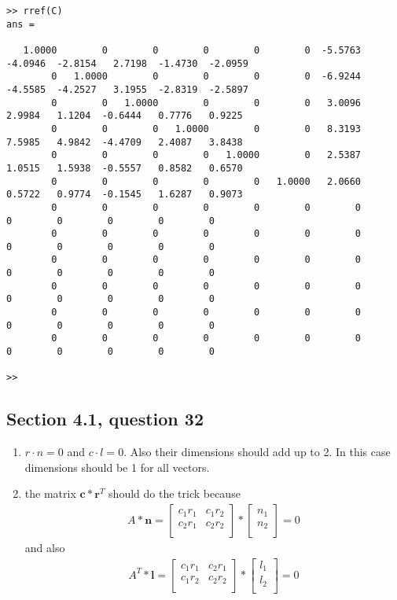 \documentclass[a4paper,11pt]{article}
\newcommand{\mybf}[1]{\boldsymbol{#1}}
\begin{document}
\begin{Verbatim}[fontsize=\tiny]
>> rref(C)
ans =

   1.0000        0        0        0        0        0  -5.5763  -4.0946  -2.8154   2.7198  -1.4730  -2.0959
        0   1.0000        0        0        0        0  -6.9244  -4.5585  -4.2527   3.1955  -2.8319  -2.5897
        0        0   1.0000        0        0        0   3.0096   2.9984   1.1204  -0.6444   0.7776   0.9225
        0        0        0   1.0000        0        0   8.3193   7.5985   4.9842  -4.4709   2.4087   3.8438
        0        0        0        0   1.0000        0   2.5387   1.0515   1.5938  -0.5557   0.8582   0.6570
        0        0        0        0        0   1.0000   2.0660   0.5722   0.9774  -0.1545   1.6287   0.9073
        0        0        0        0        0        0        0        0        0        0        0        0
        0        0        0        0        0        0        0        0        0        0        0        0
        0        0        0        0        0        0        0        0        0        0        0        0
        0        0        0        0        0        0        0        0        0        0        0        0
        0        0        0        0        0        0        0        0        0        0        0        0
        0        0        0        0        0        0        0        0        0        0        0        0

>>
\end{Verbatim}
\subsection*{Section 4.1, question 32}
\begin {enumerate} [label=\alph*]
\item $r \cdot n = 0$ and $c \cdot l = 0$. Also their dimensions should add up to 2. In this case dimensions should be 1 for all vectors. 
\item the matrix $\mybf{c} * \mybf{r}^T $ should do the trick because
\begin{align*}
A*\mybf{n}=
\begin{bmatrix}
c_1r_1 & c_1r_2 \\
c_2r_1 & c_2r_2 \\
\end{bmatrix}
*
\begin{bmatrix}
n_1 \\
n_2 \\
\end{bmatrix}
= 0
\end{align*}
and also 
\begin{align*}
A^T*\mybf{l}=
\begin{bmatrix}
c_1r_1 & c_2r_1 \\
c_1r_2 & c_2r_2 \\
\end{bmatrix}
*
\begin{bmatrix}
l_1 \\
l_2 \\
\end{bmatrix}
= 0
\end{align*}
\end {enumerate}
\end{document}
